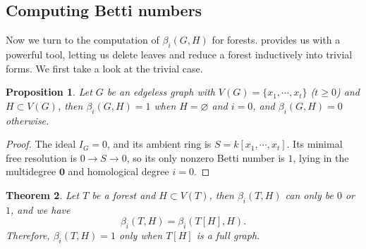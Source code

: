 \documentclass[dvipsnames,10pt]{article}
\newtheorem{theorem}{Theorem}[section]
\newtheorem{proposition}[theorem]{Proposition}
\begin{document}
\subsection{Computing Betti numbers}

Now we turn to the computation of $\beta_i(G,H)$ for forests.  provides us with a powerful tool, letting us delete leaves and reduce a forest inductively into trivial forms. We first take a look at the trivial case.

\begin{proposition}
    Let $G$ be an edgeless graph with $V(G)=\{x_1,\cdots,x_t\}$ ($t\geqslant 0$) and $H\subset V(G)$, then $\beta_i(G,H)=1$ when $H=\varnothing$ and $i=0$, and $\beta_i(G,H)=0$ otherwise.
\end{proposition}

\begin{proof}
    The ideal $I_G=0$, and its ambient ring is $S=k[x_1,\cdots,x_t]$. Its minimal free resolution is $0\to S\to 0$, so its only nonzero Betti number is $1$, lying in the multidegree $\mathbf{0}$ and homological degree $i=0$.
\end{proof}

\begin{theorem}
    Let $T$ be a forest and $H\subset V(T)$, then $\beta_i(T,H)$ can only be $0$ or $1$, and we have
    \begin{equation*}
        \beta_i(T,H)=\beta_i(T[H],H).
    \end{equation*}
    Therefore, $\beta_i(T,H)=1$ only when $T[H]$ is a full graph.
\end{theorem}
\end{document}
